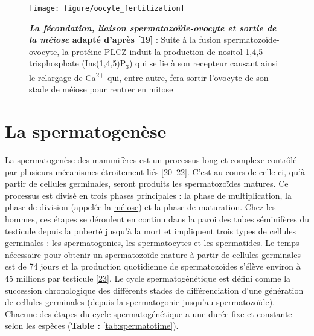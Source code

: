 \documentclass[12pt,a4paper,twoside]{ugathesis}
\theoremstyle{definition}
\theoremstyle{definition}
\theoremstyle{definition}
\theoremstyle{remark}
\begin{document}
\begin{figure}

{\centering \texttt{[image: figure/oocyte\_fertilization]} 

}

\caption[La fécondation, liaison spermatozoïde-ovocyte et sortie de la méiose]{\textbf{\emph{La fécondation, liaison
spermatozoïde-ovocyte et sortie de la méiose} adapté d'après
{[}\protect\hyperlink{ref-Clift2013}{19}{]}} : Suite à la fusion
spermatozoïde-ovocyte, la protéine PLCZ induit la production de nositol
1,4,5-trisphosphate (Ins(1,4,5)P\(_3\)) qui se lie à son recepteur
causant ainsi le relargage de Ca\textsuperscript{2+} qui, entre autre,
fera sortir l'ovocyte de son stade de méiose pour rentrer en mitose}\label{fig:oocytefertilisation}
\end{figure}









\section{La spermatogenèse}\label{la-spermatogenese}

La spermatogenèse des mammifères est un processus long et complexe
contrôlé par plusieurs mécanismes étroitement liés
{[}\protect\hyperlink{ref-Gnessi1997}{20}--\protect\hyperlink{ref-KIERSZENBAUM1994}{22}{]}.
C'est au cours de celle-ci, qu'à partir de cellules germinales, seront
produits les spermatozoïdes matures. Ce processus est divisé en trois
phases principales : la phase de multiplication, la phase de division
(appelée la \protect\hyperlink{meiose}{méiose}) et la phase de
maturation. Chez les hommes, ces étapes se déroulent en continu dans la
paroi des tubes séminifères du testicule depuis la puberté jusqu'à la
mort et impliquent trois types de cellules germinales : les
spermatogonies, les spermatocytes et les spermatides. Le temps
nécessaire pour obtenir un spermatozoïde mature à partir de cellules
germinales est de 74 jours et la production quotidienne de
spermatozoïdes s'élève environ à 45 millions par testicule
{[}\protect\hyperlink{ref-Johnson1980}{23}{]}. Le cycle
spermatogénétique est défini comme la succession chronologique des
différents stades de différenciation d'une génération de cellules
germinales (depuis la spermatogonie jusqu'au spermatozoïde). Chacune des
étapes du cycle spermatogénétique a une durée fixe et constante selon
les espèces (\textbf{Table : }\ref{tab:spermatotime}).
\end{document}
